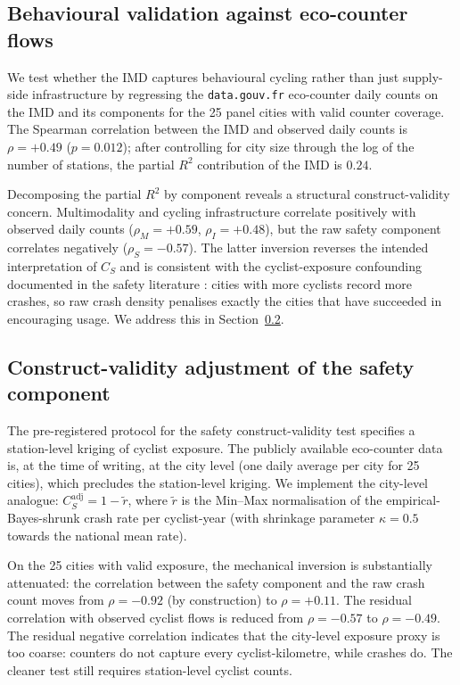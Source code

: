 \documentclass[11pt,a4paper]{article}
\begin{document}
\subsection{Behavioural validation against eco-counter flows}
\label{sec:val-flow}

We test whether the IMD captures behavioural cycling rather than
just supply-side infrastructure by regressing the
\texttt{data.gouv.fr} eco-counter daily counts on the IMD and its
components for the 25 panel cities with valid counter coverage.
The Spearman correlation between the IMD and observed daily
counts is $\rho = +0.49$ ($p = 0.012$); after controlling for
city size through the log of the number of stations, the partial
$R^{2}$ contribution of the IMD is $0.24$.

Decomposing the partial $R^{2}$ by component reveals a structural
construct-validity concern. Multimodality and cycling
infrastructure correlate positively with observed daily counts
($\rho_M = +0.59$, $\rho_I = +0.48$), but the raw safety
component correlates negatively ($\rho_S = -0.57$). The latter
inversion reverses the intended interpretation of $C_S$ and is
consistent with the cyclist-exposure confounding documented in the
safety literature \citep{Reynolds2009, Schepers2014}: cities with
more cyclists record more crashes, so raw crash density penalises
exactly the cities that have succeeded in encouraging usage. We
address this in Section~\ref{sec:val-safety}.

\subsection{Construct-validity adjustment of the safety component}
\label{sec:val-safety}

The pre-registered protocol for the safety construct-validity
test specifies a station-level kriging of cyclist exposure. The
publicly available eco-counter data is, at the time of writing, at the
city level (one daily average per city for 25 cities), which
precludes the station-level kriging. We implement the city-level
analogue: $C_S^{\mathrm{adj}} = 1 - \widetilde{r}$, where
$\widetilde{r}$ is the Min--Max normalisation of the empirical-
Bayes-shrunk crash rate per cyclist-year (with shrinkage
parameter $\kappa = 0.5$ towards the national mean rate).

On the 25 cities with valid exposure, the mechanical inversion is
substantially attenuated: the correlation between the safety
component and the raw crash count moves from $\rho = -0.92$ (by
construction) to $\rho = +0.11$. The residual correlation with
observed cyclist flows is reduced from $\rho = -0.57$ to
$\rho = -0.49$. The residual negative correlation indicates that
the city-level exposure proxy is too coarse: counters do not
capture every cyclist-kilometre, while crashes do. The cleaner
test still requires station-level cyclist counts.
\end{document}

